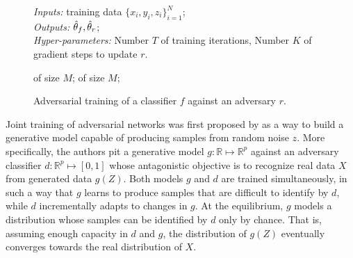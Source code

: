 \documentclass[twocolumn,superscriptaddress,aps]{revtex4-1}
\theoremstyle{plain}
\begin{document}
\begin{figure}
    \begin{minipage}{\linewidth}
    \begin{algorithm}[H]
    \caption{Adversarial training of a classifier $f$ against an adversary $r$.}

    \begin{flushleft}
        {\it Inputs:} training data $\{ x_i, y_i, z_i \}_{i=1}^N$;\\
        {\it Outputs:} $\smash{\hat\theta_f}, \smash{\hat\theta_r}$;\\
        {\it Hyper-parameters:} Number $T$ of training iterations,
                                Number $K$ of gradient steps to update $r$.
    \end{flushleft}

    \label{alg:adversarial-training}
    \begin{algorithmic}[1]
             
                 of size $M$;
            \EndFor
             of size $M$; 
        \EndFor
    \end{algorithmic}
    \end{algorithm}
    \end{minipage}
\end{figure}

Joint training of adversarial networks was first proposed by \citep{goodfellow2014generative} as a
way to build a generative model capable of producing samples from random noise
$z$. More specifically, the authors pit a generative model $g:
\mathbb{R} \mapsto \mathbb{R}^p$ against an adversary classifier $d :
\mathbb{R}^p \mapsto [0, 1]$ whose antagonistic objective is to recognize
real data $X$ from generated data $g(Z)$. Both models $g$ and $d$ are trained
simultaneously, in such a way that $g$ learns to produce samples that are
difficult to identify by $d$, while $d$ incrementally adapts to changes in $g$.
At the equilibrium, $g$ models a distribution whose samples can be identified by
$d$ only by chance. That is, assuming enough capacity in $d$ and  $g$, the
distribution of $g(Z)$ eventually converges towards the real distribution
of $X$.
\end{document}
